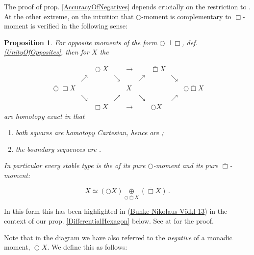 \documentclass[12pt,titlepage]{article}
\newcommand{\itexarray}[1]{\begin{matrix}#1\end{matrix}}
\theoremstyle{plain}
\newtheorem{prop}{Proposition}
\theoremstyle{definition}
\theoremstyle{remark}
\begin{document}
The proof of prop. \ref{AccuracyOfNegatives} depends crucially on the restriction to . At the other extreme, on  the intuition that $\bigcirc$-moment is complementary to $\overline{\Box}$-moment is verified in the following sense:

\begin{prop}
\label{TheHexagon}\hypertarget{TheHexagon}{}
For opposite moments of the form $\bigcirc \dashv \Box$, def. \ref{UnityOfOpposites}, then for  $X$ the 

\begin{displaymath}
\itexarray{
    && \overline{\bigcirc} X && \longrightarrow && \overline{\Box} X
    \\
    &\nearrow& &\searrow& & \nearrow && \searrow
    \\
    \overline{\bigcirc} \Box X && && X && && \bigcirc \overline{\Box} X
    \\
    &\searrow& &\nearrow & & \searrow && \nearrow
    \\
    && \Box X && \longrightarrow && \bigcirc X
  }
\end{displaymath}
are homotopy exact in that

\begin{enumerate}%
\item both squares are homotopy Cartesian, hence are ;


\item the boundary sequences are .



\end{enumerate}
In particular every stable type is the  of its pure $\bigcirc$-moment and its pure $\overline{\Box}$-moment:

\begin{displaymath}
X \simeq (\bigcirc X) \underset{\bigcirc \overline{\Box} X}{\oplus} (\overline{\Box} X)
  \,.
\end{displaymath}
\end{prop}
In this form this has been highlighted in (\hyperlink{BunkeNikolausVoelkl13}{Bunke-Nikolaus-Völkl 13}) in the context of our prop. \ref{DifferentialHexagon} below. See at \emph{} for the proof.

Note that in the diagram we have also referred to the \emph{negative} of a monadic moment, $\overline{\bigcirc} X$. We define this as follows:
\end{document}

